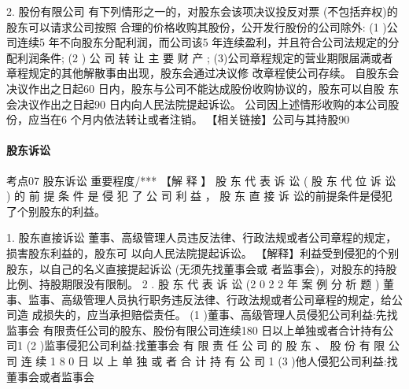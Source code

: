 \documentclass[UTF8,12pt]{ctexart}
\numberwithin{equation}{section} %
\numberwithin{figure}{section}
\numberwithin{table}{section}
\begin{document}
	2. 股份有限公司
	有下列情形之一的，对股东会该项决议投反对票 (不包括弃权)的股东可以请求公司按照 合理的价格收购其股份，公开发行股份的公司除外:
	(1 )公司连续5 年不向股东分配利润，而公司该5 年连续盈利，并且符合公司法规定的分 配利润条件;
	(2 ) 公 司 转 让 主 要 财 产 ; (3)公司章程规定的营业期限届满或者章程规定的其他解散事由出现，股东会通过决议修 改章程使公司存续。
	自股东会决议作出之日起60 日内，股东与公司不能达成股份收购协议的，股东可以自股 东会决议作出之日起90 日内向人民法院提起诉讼。 公司因上述情形收购的本公司股份，应当在6 个月内依法转让或者注销。
	【相关链接】公司与其持股90%
	
	
	\paragraph{股东诉讼}
	
	考点07 股东诉讼 重要程度/***
	【解 释 】 股 东 代 表 诉 讼 ( 股 东 代 位 诉 讼 ) 的 前 提 条 件 是 侵 犯 了 公 司 利 益 ， 股 东 直 接 诉 讼的前提条件是侵犯了个别股东的利益。
	
	1. 股东直接诉讼 董事、高级管理人员违反法律、行政法规或者公司章程的规定，损害股东利益的，股东可 以向人民法院提起诉讼。
	【解释】利益受到侵犯的个别股东，以自己的名义直接提起诉讼 (无须先找董事会或 者监事会)，对股东的持股比例、持股期限没有限制。
	2 . 股 东 代 表 诉 讼 (2 0 2 2 年 案 例 分 析 题 ) 董事、监事、高级管理人员执行职务违反法律、行政法规或者公司章程的规定，给公司造 成损失的，应当承担赔偿责任。
	(1 )董事、高级管理人员侵犯公司利益:先找监事会 有限责任公司的股东、股份有限公司连续180 日以上单独或者合计持有公司1%
	(2 )监事侵犯公司利益:找董事会
	有 限 责 任 公 司 的 股 东 、 股 份 有 限 公 司 连 续 1 8 0 日 以 上 单 独 或 者 合 计 持 有 公 司 1 %
	(3 )他人侵犯公司利益:找董事会或者监事会
	
\end{document}
